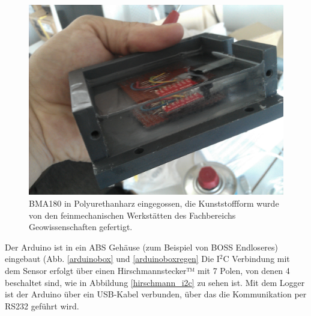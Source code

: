 \documentclass[12pt,a4paper]{scrartcl}
\begin{document}
\begin{figure}[H]
\centering
\includegraphics[scale=.14]{hardwareimages/harz.jpg}
\caption{BMA180 in Polyurethanharz eingegossen, die Kunststoffform wurde von den feinmechanischen Werkstätten des Fachbereichs Geowissenschaften gefertigt.}
\label{harz}
\end{figure}

Der Arduino ist in ein ABS Gehäuse (zum Beispiel von BOSS Endloseres) eingebaut (Abb. \ref{arduinobox} und \ref{arduinoboxregen}
Die I$^2$C Verbindung mit dem Sensor erfolgt über einen Hirschmannstecker™ mit 7 Polen, von denen 4 beschaltet sind, wie in Abbildung \ref{hirschmann_i2c} zu sehen ist.
Mit dem Logger ist der Arduino über ein USB-Kabel verbunden, über das die Kommunikation per RS232 geführt wird.
\end{document}

